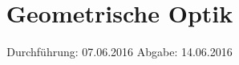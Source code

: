 

\subject{V408}
\title{Geometrische Optik}
\date{
  Durchführung: 07.06.2016
  \hspace{3em}
  Abgabe: 14.06.2016
}



\maketitle
\thispagestyle{empty}
\tableofcontents
\newpage








\printbibliography


